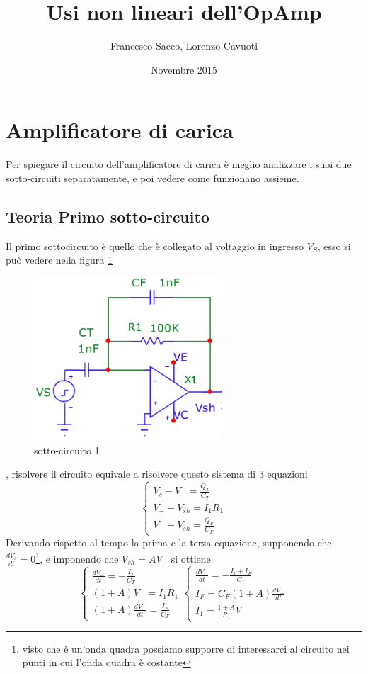 \documentclass{article}
\date{Novembre 2015}
\author{Francesco Sacco, Lorenzo Cavuoti}
\title{Usi non lineari dell'OpAmp}
\begin{document}
	\maketitle
	\section{Amplificatore di carica}
		Per spiegare il circuito dell'amplificatore di carica è meglio analizzare i suoi due sotto-circuiti separatamente, e poi vedere come funzionano assieme.\newline
		\subsection{Teoria Primo sotto-circuito}
			Il primo sottocircuito è quello che è collegato al voltaggio in ingresso $V_S$, esso si può vedere nella figura \ref{fig:circ1}
			\begin{figure}
				\label{fig:circ1}
				\centering
				\includegraphics[width=70mm]{immagini/circ1b.png}
				\caption{sotto-circuito 1}
			\end{figure}
			, risolvere il circuito equivale a risolvere questo sistema di 3 equazioni
			\begin{equation}
				\begin{cases}
					V_s-V_-=\frac{Q_T}{C_T}\\
					V_--V_{sh}=I_1R_1\\
					V_--V_{sh}=\frac{Q_F}{C_F}
				\end{cases}
			\end{equation}
			Derivando rispetto al tempo la prima e la terza equazione, supponendo che $\frac{dV_s}{dt}=0$\footnote{visto che è un'onda quadra possiamo supporre di interessarci al circuito nei punti in cui l'onda quadra è costante}, e imponendo che $V_{sh}=AV_-$ si ottiene
			\[
				\begin{cases}
					\frac{dV_-}{dt}=-\frac{I_T}{C_T}\\
					(1+A)V_-=I_1R_1\\
					(1+A)\frac{dV_-}{dt}=\frac{I_F}{C_F}
				\end{cases}
				\begin{cases}
					\frac{dV_-}{dt}=-\frac{I_1+I_F}{C_T}\\
					I_F=C_F(1+A)\frac{dV_-}{dt}\\
					I_1=\frac{1+A}{R_1}V_-
				\end{cases}
			\]
\end{document}
